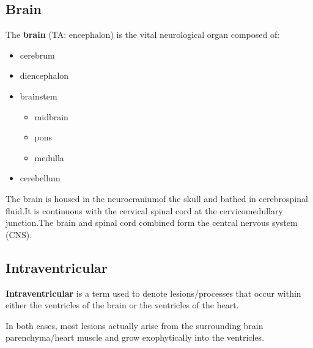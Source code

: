 \subsection{Brain}

The \textbf{brain} (TA: encephalon) is the vital neurological organ composed of:

\begin{itemize}
	\item
	cerebrum
	\item
	diencephalon
	\item
	brainstem
	
	\begin{itemize}
		\item
		midbrain
		\item
		pons
		\item
		medulla
	\end{itemize}
	\item
	cerebellum
\end{itemize}

The brain is housed in the neurocraniumof the skull and bathed in cerebrospinal fluid.It is continuous with the cervical spinal cord at the cervicomedullary junction.The brain and spinal cord combined form the central nervous system (CNS).


\subsection{Intraventricular}

\textbf{Intraventricular} is a term used to denote lesions/processes that occur within either the ventricles of the brain or the ventricles of the heart.

In both cases, most lesions actually arise from the surrounding brain parenchyma/heart muscle and grow exophytically into the ventricles.
